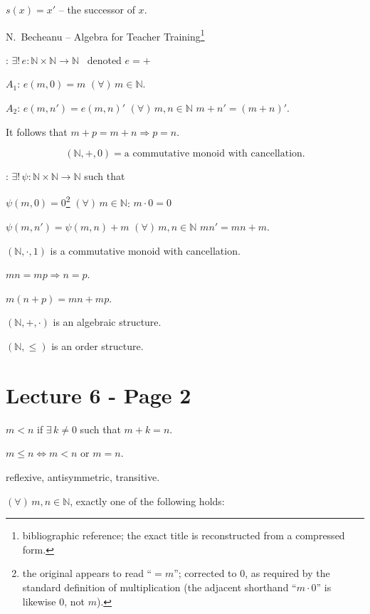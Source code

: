 \noindent $s(x)=x'$ -- the successor of $x$.

\bigskip
\noindent N.\ Becheanu -- Algebra for Teacher Training\footnote{bibliographic reference; the exact title is reconstructed from a compressed form.}

\bigskip
\noindent{}: $\exists!\, e:\mathbb{N}\times\mathbb{N}\to\mathbb{N}$ \ denoted $e=+$

\noindent $A_1$: $e(m,0)=m$ $(\forall)\,m\in\mathbb{N}$.

\noindent $A_2$: $e(m,n')=e(m,n)'$ $(\forall)\,m,n\in\mathbb{N}$ \quad $m+n'=(m+n)'$.

\bigskip
\noindent It follows that $m+p=m+n \Rightarrow p=n$.

\[
(\mathbb{N},+,0) = \text{a commutative monoid with cancellation.}
\]

\bigskip
\noindent{}: $\exists!\, \psi:\mathbb{N}\times\mathbb{N}\to\mathbb{N}$ such that

\noindent $\psi(m,0)=0$\footnote{the original appears to read ``$=m$''; corrected to $0$, as required by the standard definition of multiplication (the adjacent shorthand ``$m\cdot 0$'' is likewise $0$, not $m$).} $(\forall)\,m\in\mathbb{N}$: \quad $m\cdot 0=0$

\noindent $\psi(m,n')=\psi(m,n)+m$ $(\forall)\,m,n\in\mathbb{N}$ \quad $mn'=mn+m$.

\bigskip
\noindent $(\mathbb{N},\cdot,1)$ is a commutative monoid with cancellation.

\noindent $mn=mp \Rightarrow n=p$.

\noindent $m(n+p)=mn+mp$.

\bigskip
\noindent $(\mathbb{N},+,\cdot)$ is an algebraic structure.

\noindent $(\mathbb{N},\leq)$ is an order structure.



\section*{Lecture 6 - Page 2}

\noindent $m<n$ if $\exists\, k\neq 0$ such that $m+k=n$.

\noindent $m\leq n \Longleftrightarrow m<n$ or $m=n$.

\noindent reflexive, antisymmetric, transitive.

\bigskip
\noindent $(\forall)\,m,n\in\mathbb{N}$, exactly one of the following holds:

